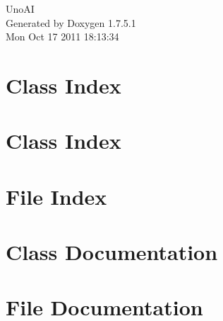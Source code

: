 \documentclass[a4paper]{book}
\begin{document}
\hypersetup{pageanchor=false,citecolor=blue}
\begin{titlepage}
\vspace*{7cm}
\begin{center}
{\Large \-Uno\-A\-I }\\
\vspace*{1cm}
{\large \-Generated by Doxygen 1.7.5.1}\\
\vspace*{0.5cm}
{\small Mon Oct 17 2011 18:13:34}\\
\end{center}
\end{titlepage}
\clearemptydoublepage
{}
\tableofcontents
\clearemptydoublepage
{}
\hypersetup{pageanchor=true,citecolor=blue}
\chapter{\-Class \-Index}

\chapter{\-Class \-Index}

\chapter{\-File \-Index}

\chapter{\-Class \-Documentation}





\chapter{\-File \-Documentation}















\printindex
\end{document}
